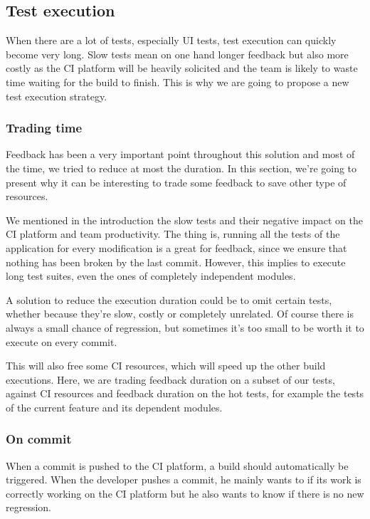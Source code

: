 \subsection{Test execution}\label{subsec:test-execution}
When there are a lot of tests, especially UI tests, test execution can quickly
become very long.
Slow tests mean on one hand longer feedback but also more costly as the CI
platform will be heavily solicited and the team is likely to waste time waiting
for the build to finish.
This is why we are going to propose a new test execution strategy.

\subsubsection{Trading time}
Feedback has been a very important point throughout this solution
and most of the time, we tried to reduce at most the duration.
In this section, we're going to present why it can be interesting to
trade some feedback to save other type of resources.

We mentioned in the introduction the slow tests and their negative impact on
the CI platform and team productivity.
The thing is, running all the tests of the application for every modification
is a great for feedback, since we ensure that nothing has been broken by the
last commit.
However, this implies to execute long test suites, even the ones of
completely independent modules.

A solution to reduce the execution duration could be to omit certain tests,
whether because they're slow, costly or completely unrelated.
Of course there is always a small chance of regression, but sometimes it's
too small to be worth it to execute on every commit.

This will also free some CI resources, which will speed up the other build
executions.
Here, we are trading feedback duration on a subset of our tests, against CI
resources and feedback duration on the hot tests, for example the tests of the
current feature and its dependent modules.

\subsubsection{On commit}
When a commit is pushed to the CI platform, a build should automatically be
triggered.
When the developer pushes a commit, he mainly wants to if its work is
correctly working on the CI platform but he also wants to know if there is no
new regression.

